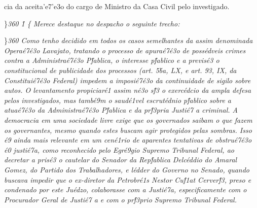  \ltrch{}  cia da aceita'e7'e3o
do cargo de Ministro da Casa Civil pelo investigado.
\par \}\pard\plain \ltrpar{}\ql {}\sl360\widctlpar\wrapdefault\aspalpha\aspnum\faauto\adjustright{} \rtlch{}  \ltrch{} 
\f1\cgrid{} \{\rtlch{}
 \ltrch{}  Merece destaque no
despacho o seguinte trecho:
\par \}\pard \ltrpar{}\qj {}\sl360\widctlpar\wrapdefault\aspalpha\aspnum\faauto\adjustright{} {\rtlch{} \ai{} \ltrch{}  
Como tenho decidido em todos os casos semelhantes da assim denominada Opera\'e7\'e3o Lavajato, tratando o processo de apura\'e7\'e3o de poss\'edveis crimes contra a Administra\'e7\'e3o P\'fablica, o interesse p\'fablico e a previs\'e3
o constitucional de publicidade dos processos (art. 5\'ba, LX, e art. 93, IX, da Constitui\'e7\'e3o Federal) impedem a imposi\'e7\'e3o da continuidade de sigilo sobre autos. O levantamento propiciar\'e1 assim n\'e3o s\'f3 o exerc\'edcio da 
ampla defesa pelos investigados, mas tamb\'e9m o saud\'e1vel escrut\'ednio p\'fablico sobre a atua\'e7\'e3o da Administra\'e7\'e3o P\'fablica e da pr\'f3pria Justi\'e7
a criminal. A democracia em uma sociedade livre exige que os governados saibam o que fazem os governantes, mesmo quando estes buscam agir protegidos pelas sombras.}{\rtlch{}  \ltrch{}   }{\rtlch{} \ai{} 
\ltrch{}  Isso \'e9 ainda mais relevante em um cen\'e1rio de aparentes tentativas de obstru\'e7\'e3o \'e0 justi\'e7a, como reconhecido pelo Egr\'e9gio Supremo Tribunal Federal, ao decretar a pris\'e3
o cautelar do Senador da Rep\'fablica Delc\'eddio do Amaral Gomez, do Partido dos Trabalhadores, e l\'edder do Governo no Senado, quando buscava impedir que o }{\rtlch{} \ai{} \ltrch{}  ex-diretor}{
\rtlch{} \ai{} \ltrch{}   da Petrobr\'e1s Nestor Cu\'f1at Cerver\'f3, preso e condenado por este Ju\'edzo, colaborasse com a Justi\'e7a, especificamente com o Procurador Geral de Justi\'e7
a e com o pr\'f3prio Supremo Tribunal Federal.}{\rtlch{} \ai{} \ltrch{} \super{} }
